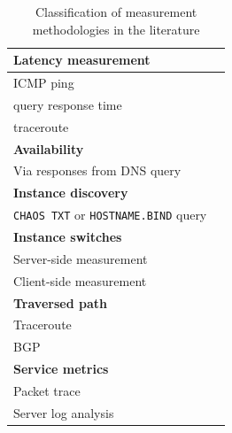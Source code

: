 \begin{table}[!ht]	
	\begin{center}
		\begin{tabular}{p{6.5cm} p{6.5cm}}
			\hline
			\multicolumn{2}{l}{\textbf{Latency measurement}} \\
			\hline
			ICMP ping & \cite{colitti2006evaluating,cicalese2015first,cicalese2015characterizing,cicalese2015fistful,analysing-k-root,cicalese2015latency} \\
			query response time & \cite{karrenberg2005anycast,sarat2006use,colitti2006evaluating,Ballani:2006:MDP:1177080.1177109,5488355,aminvisualization}\\
			traceroute & \cite{yumeasuring,madory2013anycasters} \\
			\hline
			\multicolumn{2}{l}{\textbf{Availability}} \\
			\hline
			Via responses from DNS query & \cite{karrenberg2005anycast,sarat2006use,5488355} \\
			\hline
			\multicolumn{2}{l}{\textbf{Instance discovery}} \\
			\hline
			\texttt{CHAOS TXT} or \texttt{HOSTNAME.BIND} query & \cite{colitti2006evaluating,hiebert2006determining,report:fan2011identifying,yumeasuring,6566965,analysing-k-root,cicalese2015latency,aminvisualization}\\
			\hline
			\multicolumn{2}{l}{\textbf{Instance switches}} \\
			\hline
			Server-side measurement & \cite{barber2004life, colitti2006evaluating} \\
			Client-side measurement & \cite{karrenberg2005anycast,boothe2005dns,sarat2006use,hiebert2006determining,Ballani:2006:MDP:1177080.1177109} \\
			\hline
			\multicolumn{2}{l}{\textbf{Traversed path}} \\
			\hline
			Traceroute & \cite{report:fan2011identifying,yumeasuring,madory2013anycasters}\\
			BGP & \cite{boothe2005dns,Ballani:2006:MDP:1177080.1177109,levine2006operational,gibbard2007observations,liu2007two,yumeasuring,madory2013anycasters}\\
			\hline
			\multicolumn{2}{l}{\textbf{Service metrics}} \\
			\hline
			Packet trace & \cite{levine2006operational, liu2007two,6314173,cicalese2015first} \\
			Server log analysis & \cite{Calder:2015:APA:2815675.2815717} \\
			\hline
		\end{tabular}
	\end{center}
	\caption{Classification of measurement methodologies in the literature}
	\label{table:measurement-class}
\end{table}

